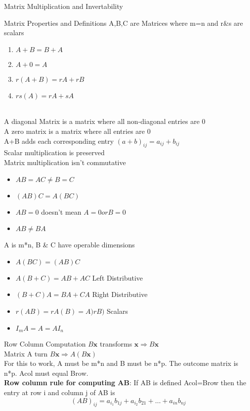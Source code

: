 \documentclass[a4paper, 12pt]{article}
\begin{document}
\begin{section}{Matrix Multiplication and Invertability}
\begin{subsection}{Matrix Properties and Definitions}
A,B,C are Matrices where m=n and r&s are scalars
\begin{enumerate}
\item{$A+B=B+A$}
\item{$A+0=A$}
\item{$r(A+B)=rA+rB$}
\item{$rs(A)=rA+sA$}
\end{enumerate}
\\
A diagonal Matrix is a matrix where all non-diagonal entries are 0\\
A zero matrix is a matrix where all entries are 0\\
A+B adds each corresponding entry $(a+b)_{ij}=a_{ij}+b_{ij}$\\
Scalar multiplication is preserved \\
Matrix multiplication isn't commutative\\
\begin{itemize}
\item{$AB=AC\neq B=C$}
\item{$(AB)C=A(BC)$}
\item{$AB=0$ doesn't mean $A=0 or B=0$}
\item{$AB\neq BA$}
\end{itemize}
A is m*n, B & C have operable dimensions
\begin{itemize}
\item{$A(BC)=(AB)C$}
\item{$A(B+C)=AB+AC$ Left Distributive}
\item{$(B+C)A=BA+CA$ Right Distributive}
\item{$r(AB)=rA(B)=A)rB)$ Scalars}
\item{$I_{m}A=A=AI_{n}$}
\end{itemize}
\end{subsection}

\begin{subsection}{Row Column Computation}
$B\textbf{x}$ transforms $\textbf{x} \Rightarrow B\textbf{x}$\\
Matrix A turn $B\textbf{x}\Rightarrow A(B\textbf{x})$\\
For this to work, A must be m*n and B must be n*p. The outcome matrix
is n*p. Acol must equal Brow.
\\
\textbf{Row column rule for computing AB}: If AB is defined Acol=Brow
then the entry at row i and column j of AB is
\begin{equation}
	(AB)_{ij}=a_{i_1}b_{1j}+a_{i_2}b_{21}+\dots+a_{in}b_{nj}
\end{equation}
\end{subsection}


\end{section}
\end{document}
